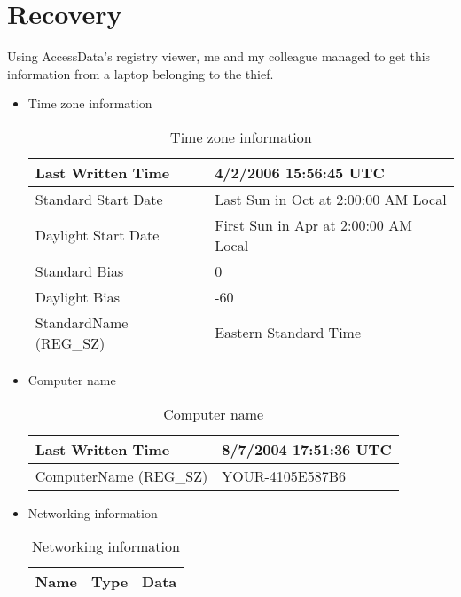 \documentclass[5pt]{article}
\begin{document}
\maketitle



\section{Recovery}
Using AccessData's registry viewer, me and my colleague managed to get this
information from a laptop belonging to the thief.

\begin{itemize}
  \item Time zone information
  \begin{table}[ht]
  \centering
  \caption{Time zone information}
  \begin{tabular}{|l|l|}
  \hline
    Last Written Time  & 4/2/2006 15:56:45 UTC  \\
  \hline
  Standard Start Date & Last Sun in Oct at 2:00:00 AM Local\\
  \hline
  Daylight Start Date & First Sun in Apr at 2:00:00 AM Local  \\ 
  \hline
  Standard Bias  & 0 \\ 
  \hline
  Daylight Bias & -60 \\ 
  \hline
  StandardName (REG\_SZ) & Eastern Standard Time \\ 
  \hline
  
  
  \end{tabular}
  \label{tab:timeZoneTab}
\end{table}

\item Computer name
\begin{table}[ht]
  \centering
  \caption{Computer name}
  \begin{tabular}{|l|l|}
  \hline
    Last Written Time  & 8/7/2004 17:51:36 UTC  \\
  \hline
  ComputerName (REG\_SZ) & YOUR-4105E587B6\\
  
  \hline
  
  
  \end{tabular}
  \label{tab:compNameTab}
\end{table}

\newpage

\item Networking information
\begin{table}[ht]
  \centering
  \caption{Networking information}
  \begin{tabular}{|l|l|l|}
  \hline
  Name & Type & Data\\
  \hline
  \hline
  

\end{tabular}
\end{table}
\end{itemize}
\end{document}
